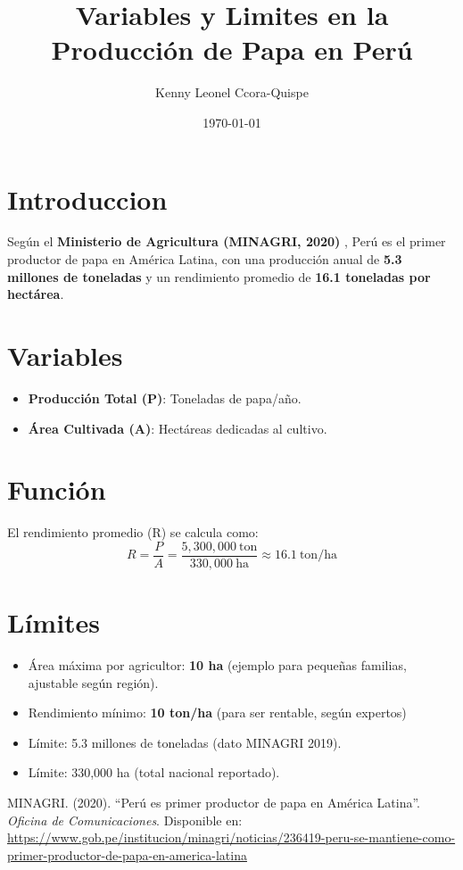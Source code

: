 \documentclass{article}
\begin{document}
\title{Variables y Limites en la Producción de Papa en Perú}
\author{Kenny Leonel Ccora-Quispe}
\date{\today}
\maketitle

\section{Introduccion}
Según el \textbf{Ministerio de Agricultura (MINAGRI, 2020)} \cite{minagri2020}, Perú es el primer productor de papa en América Latina, con una producción anual de \textbf{5.3 millones de toneladas} y un rendimiento promedio de \textbf{16.1 toneladas por hectárea}.

\section{Variables}
\begin{itemize}
    \item \textbf{Producción Total (P)}: Toneladas de papa/año.
    \item \textbf{Área Cultivada (A)}: Hectáreas dedicadas al cultivo.
\end{itemize}

\section{Función}
El rendimiento promedio (R) se calcula como:
\[
R = \frac{P}{A} = \frac{5,300,000\ \text{ton}}{330,000\ \text{ha}} \approx 16.1\ \text{ton/ha}
\]

\section{Límites}
\begin{itemize}
    \item Área máxima por agricultor: \textbf{10 ha} (ejemplo para pequeñas familias, ajustable según región).
    \item Rendimiento mínimo: \textbf{10 ton/ha} (para ser rentable, según expertos)
    \item Límite: 5.3 millones de toneladas (dato MINAGRI 2019).
    \item Límite: 330,000 ha (total nacional reportado).
\end{itemize}

\begin{thebibliography}{9}
MINAGRI. (2020). ``Perú es primer productor de papa en América Latina''. \\
\emph{Oficina de Comunicaciones}. Disponible en: \\
\url{https://www.gob.pe/institucion/minagri/noticias/236419-peru-se-mantiene-como-primer-productor-de-papa-en-america-latina}
\end{thebibliography}
\end{document}
